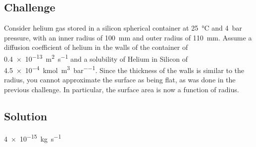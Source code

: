 \subsection*{Challenge}
Consider helium gas stored in a silicon spherical container at \SI{25}{\celsius} and \SI{4}{\bar} pressure, with an inner radius of \SI{100}{\mm} and outer radius of \SI{110}{\mm}. Assume a diffusion coefficient of helium in the walls of the container of \SI{0.4e-13}{\square\meter\per\second} and a solubility of Helium in Silicon of \SI{4.5e-4}{\kmol\per\cubic\meter\per\bar}. Since the thickness of the walls is similar to the radius, you cannot approximate the surface as being flat, as was done in the previous challenge. In particular, the surface area is now a function of radius.

\subsection*{Solution}
\SI{4e-15}{\kg\per\second}
